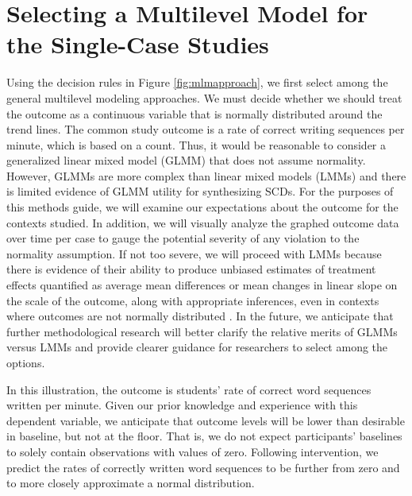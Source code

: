\documentclass[
]{book}
\begin{document}
\hypertarget{selecting-a-multilevel-model-for-the-single-case-studies-1}{%
\section{Selecting a Multilevel Model for the Single-Case Studies}\label{selecting-a-multilevel-model-for-the-single-case-studies-1}}

Using the decision rules in Figure \ref{fig:mlmapproach}, we first select among the general multilevel modeling approaches. We must decide whether we should treat the outcome as a continuous variable that is normally distributed around the trend lines. The common study outcome is a rate of correct writing sequences per minute, which is based on a count. Thus, it would be reasonable to consider a generalized linear mixed model (GLMM) that does not assume normality. However, GLMMs are more complex than linear mixed models (LMMs) and there is limited evidence of GLMM utility for synthesizing SCDs. For the purposes of this methods guide, we will examine our expectations about the outcome for the contexts studied. In addition, we will visually analyze the graphed outcome data over time per case to gauge the potential severity of any violation to the normality assumption. If not too severe, we will proceed with LMMs because there is evidence of their ability to produce unbiased estimates of treatment effects quantified as average mean differences or mean changes in linear slope on the scale of the outcome, along with appropriate inferences, even in contexts where outcomes are not normally distributed \citep{Declercq2019, Joo_Ferron_2019}. In the future, we anticipate that further methodological research will better clarify the relative merits of GLMMs versus LMMs and provide clearer guidance for researchers to select among the options.

In this illustration, the outcome is students' rate of correct word sequences written per minute. Given our prior knowledge and experience with this dependent variable, we anticipate that outcome levels will be lower than desirable in baseline, but not at the floor. That is, we do not expect participants' baselines to solely contain observations with values of zero. Following intervention, we predict the rates of correctly written word sequences to be further from zero and to more closely approximate a normal distribution.
\end{document}
